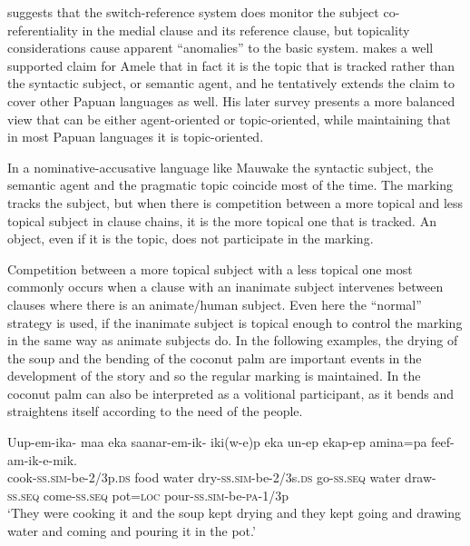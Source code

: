 \citet[242--243]{Reesink1983a} suggests that the switch-reference system does monitor the subject co-referentiality in the medial clause and its reference clause, but topicality considerations cause apparent ``anomalies'' to the basic system.  \citet{Roberts1988b} makes a well supported claim for Amele that in fact it is the topic that is tracked rather than the syntactic subject, or semantic agent, and he tentatively extends the claim to cover other Papuan languages as well. His later survey \citep{Roberts1997} presents a more balanced view that  can be either agent-oriented or topic-oriented, while maintaining that in most Papuan languages it is topic-oriented. 

In a nominative-accusative language like Mauwake the syntactic subject, the semantic agent and the pragmatic topic coincide most of the time. The  marking tracks the subject, but when there is competition between a more topical and less topical subject in clause chains, it is the more topical one that is tracked. An object, even if it is the topic, does not participate in the  marking.

Competition between a more topical subject with a less topical one most commonly occurs when a clause with an inanimate subject intervenes between clauses where there is an animate/human subject. Even here the ``normal''  strategy is used, if the inanimate subject is topical enough to control the  marking in the same way as animate subjects do. In the following examples, the drying of the soup  and the bending of the coconut palm  are important events in the development of the story and so the regular  marking is maintained. In  the coconut palm can also be interpreted as a volitional participant, as it bends and straightens itself according to the need of the people.

\ea%
\label{ex:8:x1474}
\gll Uup-em-ika- \textstyleEmphasizedVernacularWords{} maa  eka  saanar-em-ik- iki(w-e)p  eka  un-ep  ekap-ep  amina=pa feef-am-ik-e-mik.\\
cook-\textsc{ss}.\textsc{sim}-be-2/3p.\textsc{ds} food water  dry-\textsc{ss}.\textsc{sim}-be-2/3s.\textsc{ds} go-\textsc{ss}.\textsc{seq}  water  draw-\textsc{ss}.\textsc{seq} come-\textsc{ss}.\textsc{seq} pot=\textsc{loc} pour-\textsc{ss}.\textsc{sim}-be-\textsc{pa}-1/3p\\
\glt`They were cooking it and the soup kept drying and they kept going and drawing water and coming and pouring it in the pot.'
\z



